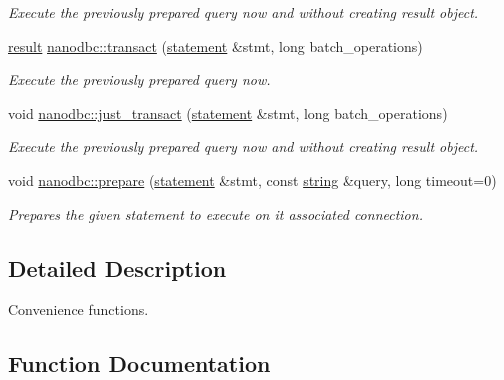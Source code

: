 \begin{DoxyCompactItemize}
\begin{DoxyCompactList}\small\item\em Execute the previously prepared query now and without creating result object. \end{DoxyCompactList}\item 
\mbox{\hyperlink{classnanodbc_1_1result}{result}} \mbox{\hyperlink{group__mainf_ga3f5b3e15f31690ef54ca20058ea89074}{nanodbc\+::transact}} (\mbox{\hyperlink{classnanodbc_1_1statement}{statement}} \&stmt, long batch\+\_\+operations)
\begin{DoxyCompactList}\small\item\em Execute the previously prepared query now. \end{DoxyCompactList}\item 
void \mbox{\hyperlink{group__mainf_ga343e69acce5e8122723ca8d38b0a7f92}{nanodbc\+::just\+\_\+transact}} (\mbox{\hyperlink{classnanodbc_1_1statement}{statement}} \&stmt, long batch\+\_\+operations)
\begin{DoxyCompactList}\small\item\em Execute the previously prepared query now and without creating result object. \end{DoxyCompactList}\item 
void \mbox{\hyperlink{group__mainf_ga961a75629487f22ebc87d114c5699bc2}{nanodbc\+::prepare}} (\mbox{\hyperlink{classnanodbc_1_1statement}{statement}} \&stmt, const \mbox{\hyperlink{namespacenanodbc_abfc0ece56278e590911ec8352774c212}{string}} \&query, long timeout=0)
\begin{DoxyCompactList}\small\item\em Prepares the given statement to execute on it associated connection. \end{DoxyCompactList}\end{DoxyCompactItemize}


\subsection{Detailed Description}
Convenience functions. 



\subsection{Function Documentation}
\mbox{\label{group__mainf_ga5cbac617a3964611bd16a2fc6f991b83}} 
